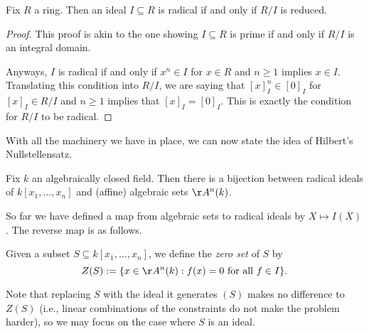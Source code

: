\begin{lemma}
	Fix $R$ a ring. Then an ideal $I\subseteq R$ is radical if and only if $R/I$ is reduced.
\end{lemma}
\begin{proof}
	This proof is akin to the one showing $I\subseteq R$ is prime if and only if $R/I$ is an integral domain.

	Anyways, $I$ is radical if and only if $x^n\in I$ for $x\in R$ and $n\ge1$ implies $x\in I$. Translating this condition into $R/I$, we are saying that $[x]_I^n\in[0]_I$ for $[x]_I\in R/I$ and $n\ge1$ implies that $[x]_I=[0]_I$. This is exactly the condition for $R/I$ to be radical.
\end{proof}
With all the machinery we have in place, we can now state the idea of Hilbert's Nullstellensatz.
\begin{theorem}[Nullstellensatz, I]
	Fix $k$ an algebraically closed field. Then there is a bijection between radical ideals of $k[x_1,\ldots,x_n]$ and (affine) algebraic sets $\AA^n(k)$.
\end{theorem}
So far we have defined a map from algebraic sets to radical ideals by $X\mapsto I(X)$. The reverse map is as follows.
\begin{definition}[\texorpdfstring{$Z(I)$}{Z(I)}]
	Given a subset $S\subseteq k[x_1,\ldots,x_n]$, we define the \textit{zero set} of $S$ by
	\[Z(S):=\{x\in\AA^n(k):f(x)=0\text{ for all }f\in I\}.\]
\end{definition}
Note that replacing $S$ with the ideal it generates $(S)$ makes no difference to $Z(S)$ (i.e., linear combinations of the constraints do not make the problem harder), so we may focus on the case where $S$ is an ideal.

